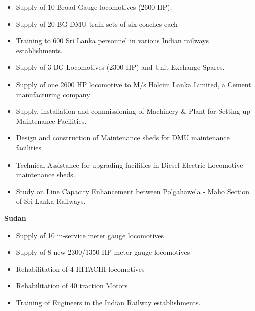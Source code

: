 \bigskip

\begin{itemize}
\item {\color[rgb]{0.0,0.0,0.039215688}
Supply of 10 Broad Gauge locomotives (2600 HP).}
\item {\color[rgb]{0.0,0.0,0.039215688}
Supply of 20 BG DMU train sets of six coaches each}
\item {\color[rgb]{0.0,0.0,0.039215688}
Training to 600 Sri Lanka personnel in various Indian railways establishments.}
\item {\color[rgb]{0.0,0.0,0.039215688}
Supply of 3 BG Locomotives (2300 HP) and Unit Exchange Spares.}
\item {\color[rgb]{0.0,0.0,0.039215688}
Supply of one 2600 HP locomotive to M/s Holcim Lanka Limited, a Cement manufacturing company }
\item {\color[rgb]{0.0,0.0,0.039215688}
Supply, installation and commissioning of Machinery \& Plant for Setting up Maintenance Facilities.}
\item {\color[rgb]{0.0,0.0,0.039215688}
Design and construction of Maintenance sheds for DMU maintenance facilities}
\item {\color[rgb]{0.0,0.0,0.039215688}
Technical Assistance for upgrading facilities in Diesel Electric Locomotive maintenance sheds. }
\item {\color[rgb]{0.0,0.0,0.039215688}
Study on Line Capacity Enhancement between Polgahawela - Maho Section of Sri Lanka Railways.}
\end{itemize}

\bigskip

{\color[rgb]{0.0,0.0,0.039215688}
\textbf{Sudan}}


\bigskip

\begin{itemize}
\item {\color[rgb]{0.0,0.0,0.039215688}
Supply of 10 in-service meter gauge locomotives }
\item {\color[rgb]{0.0,0.0,0.039215688}
Supply of 8 new 2300/1350 HP meter gauge locomotives }
\item {\color[rgb]{0.0,0.0,0.039215688}
Rehabilitation of 4 HITACHI locomotives }
\item {\color[rgb]{0.0,0.0,0.039215688}
Rehabilitation of 40 traction Motors }
\item {\color[rgb]{0.0,0.0,0.039215688}
Training of Engineers in the Indian Railway establishments.}
\end{itemize}

